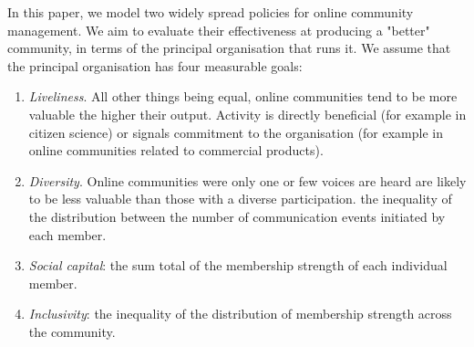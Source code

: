 In this paper, we model two widely spread policies for online community management. We aim to evaluate their effectiveness at producing a "better" community, in terms of the principal organisation that runs it. We assume that the principal organisation has four measurable goals:

\begin{enumerate}
	\item \textit{Liveliness}. All other things being equal, online communities tend to be more valuable the higher their output. Activity is directly beneficial (for example in citizen science) or signals commitment to the organisation (for example in online communities related to commercial products). 
	\item  \textit{Diversity}. Online communities were only one or few voices are heard are likely to be less valuable than those with a diverse participation.  the inequality of the distribution between the number of communication events initiated by each member. 
	\item \textit{Social capital}: the sum total of the membership strength of each individual member.
	\item \textit{Inclusivity}: the inequality of the distribution of membership strength across the community.
\end{enumerate}